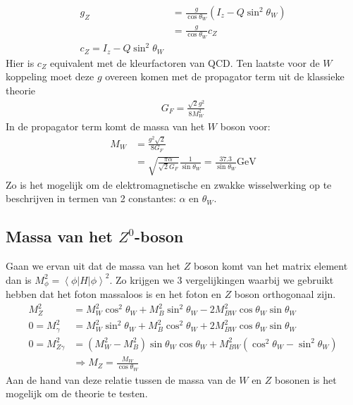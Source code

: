 \documentclass[../main.tex]{subfiles}
\begin{document}
\begin{equation}
    \begin{aligned}
        \label{eq:koppeling_z}
        g_Z &= \frac{g}{\cos\theta_W} (I_z - Q\sin^2\theta_W)\\
            &= \frac{g}{\cos\theta_W} c_Z\\
            c_Z = I_z - Q\sin^2\theta_W
    \end{aligned}
\end{equation}
Hier is $c_Z$ equivalent met de kleurfactoren van QCD. Ten laatste voor de $W$ koppeling moet deze $g$ overeen komen met de propagator term uit de klassieke theorie
\begin{equation}
    \begin{aligned}
        \label{eq:koppeling_w}
        G_F = \frac{\sqrt{2}g^2}{8M_W^2} 
    \end{aligned}
\end{equation}
In de propagator term komt de massa van het $W$ boson voor:
\begin{equation}
    \begin{aligned}
        \label{eq:massa_w}
        M_W &= \frac{g^2\sqrt{2}}{8G_F} \\
            &= \sqrt{ \frac{\pi\alpha}{\sqrt{2}G_F}} \frac{1}{\sin\theta_W} = \frac{37.3}{\sin\theta_W} \text{GeV}
    \end{aligned}
\end{equation}
Zo is het mogelijk om de elektromagnetische en zwakke wisselwerking op te beschrijven in termen van 2 constantes: $\alpha$ en $\theta_W$.

\subsection{Massa van het $Z^0$-boson}%
\label{sub:massa_van_het_z_0_boson}

Gaan we ervan uit dat de massa van het $Z$ boson komt van het matrix element dan is $M_\phi^2 = \left<\phi|H|\phi\right>^2$. Zo krijgen we 3 vergelijkingen waarbij we gebruikt hebben dat het foton massaloos is en het foton en $Z$ boson orthogonaal zijn.
\begin{equation}
    \begin{aligned}
        \label{eq:massa_z}
        M_Z^2 &= M_W^2 \cos^2\theta_W + M_B^2\sin^2\theta_W - 2M_{BW}^2\cos\theta_W\sin\theta_W\\
        0=M_\gamma^2 &= M_W^2 \sin^2\theta_W + M_B^2\cos^2\theta_W + 2M_{BW}^2\cos\theta_W\sin\theta_W\\
        0=M_{Z\gamma}^2 &= (M_W^2-M_B^2) \sin\theta_W\cos\theta_W + M_{BW}^2(\cos^2\theta_W-\sin^2\theta_W)\\
                        &\Rightarrow M_Z = \frac{M_W}{\cos\theta_W}
    \end{aligned}
\end{equation}
Aan de hand van deze relatie tussen de massa van de $W$ en $Z$ bosonen is het mogelijk om de theorie te testen.
\end{document}
